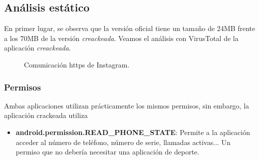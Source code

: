 \documentclass[12pt,twoside]{article}
\begin{document}
\subsection{Análisis estático}
En primer lugar, se observa que la versión oficial tiene un tamaño de 24MB frente a los 70MB de la versión \textit{creackeada}.
Veamos el análisis con VirusTotal de la aplicación \textit{creackeada}.
\begin{figure}[H]
    \centering
    \caption{Comunicación https de Instagram.}
\end{figure}
\subsubsection{Permisos}
Ambas aplicaciones utilizan prácticamente los mismos permisos, sin embargo, la aplicación crackeada utiliza
\begin{itemize}
    \item \textbf{android.permission.READ\_PHONE\_STATE}: Permite a la aplicación acceder al número de teléfono, número de serie, llamadas activas... Un permiso que no debería necesitar una aplicación de deporte.
\end{itemize}
\end{document}
